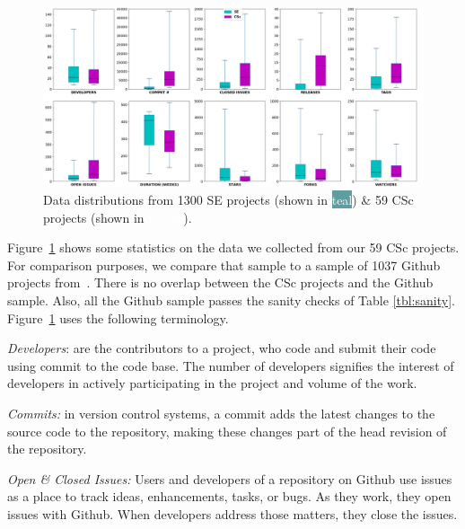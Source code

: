 \documentclass[conference,10pt]{IEEEtran}
\begin{document}
\begin{figure}[!t]
\vspace{-5pt}
\centering \includegraphics[width=.95\linewidth]{img/summary.png}

\caption{Data distributions from 1300 SE projects (shown in \colorbox{cadetblue}{\textcolor{white}{teal}}) \& 59 CSc projects (shown in \colorbox{amethyst}{\textcolor{white}{purple}}).}\label{fig:comparison}
\vspace{-13pt}
\end{figure}    



Figure~\ref{fig:comparison} shows some statistics on the data we collected from our 59 CSc projects. For comparison purposes, we compare that sample to 
a sample of 1037 Github projects from~\cite{Majumder19}.
There is no overlap between the CSc projects and the Github sample. Also, all the Github
sample passes the sanity checks of Table \ref{tbl:sanity}. Figure~\ref{fig:comparison} uses the following terminology.


\textit{Developers}: are the contributors to a project, who code and submit their code using commit to the code base. The number of developers signifies the interest of developers in actively participating in the project and volume of the work.
  
  

\textit{Commits:} in version control systems, a commit adds the latest changes to the source code to the repository, making these changes part of the head revision of the repository. 

\textit{Open \& Closed Issues:} Users and developers of a repository on Github use issues as a place to track ideas, enhancements, tasks, or bugs. As they work, they open issues with Github. When developers address those matters, they close the issues.
\end{document}

